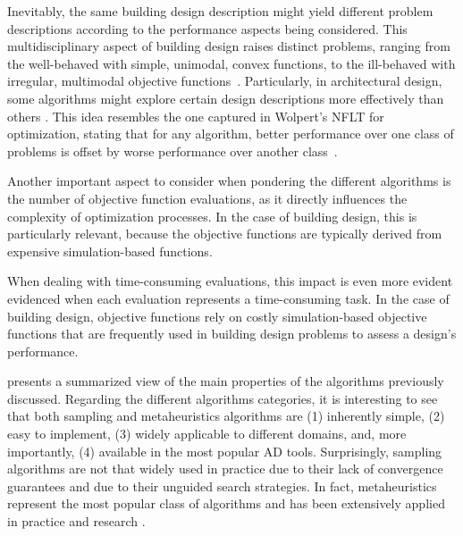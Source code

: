	Inevitably, the same building design description might yield different problem descriptions according to the performance aspects being considered. This multidisciplinary aspect of building design raises distinct problems, ranging from the well-behaved with simple, unimodal, convex functions, to the ill-behaved with irregular, multimodal objective functions~\cite{Wortmann2017ADO}. Particularly, in architectural design, some algorithms might explore certain design descriptions more effectively than others%
	\cite{Wortmann2017GABESTCHOICE, Fang2017}. This idea resembles the one captured in Wolpert's \ac{NFLT} for optimization, stating that for any algorithm, better performance over one class of problems is offset by worse performance over another class~\cite{Wolpert1997NFLT}. 
	
	Another important aspect to consider when pondering the different algorithms is the number of objective function evaluations, as it directly influences the complexity of optimization processes. In the case of building design, this is particularly relevant, because the objective functions are typically derived from expensive simulation-based functions.
	
	When dealing with time-consuming evaluations, this impact is even more evident evidenced when each evaluation represents a time-consuming task. In the case of building design, objective functions rely on costly simulation-based objective functions that are frequently used in building design problems to assess a design's performance. 	
	
	 presents a summarized view of the main properties of the algorithms previously discussed. Regarding the different algorithms categories, it is interesting to see that both sampling and metaheuristics algorithms are (1) inherently simple, (2) easy to implement, (3) widely applicable to different domains, and, more importantly, (4) available in the most popular \ac{AD} tools. Surprisingly, sampling algorithms are not that widely used in practice due to their lack of convergence guarantees and due to their unguided search strategies. In fact, metaheuristics represent the most popular class of algorithms and has been extensively applied in practice and research \cite{Wortmann2017ADO}. 
	

